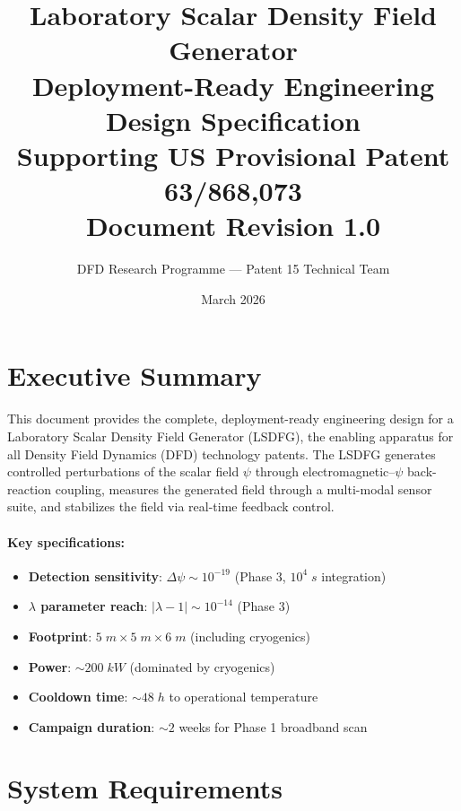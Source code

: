 \documentclass[11pt,a4paper]{article}
\title{\textbf{Laboratory Scalar Density Field Generator}\\[6pt]
\large Deployment-Ready Engineering Design Specification\\[6pt]
\normalsize Supporting US Provisional Patent 63/868,073\\
Document Revision 1.0}
\author{DFD Research Programme --- Patent 15 Technical Team}
\date{March 2026}
\begin{document}
\maketitle
\tableofcontents
\newpage

\section{Executive Summary}

This document provides the complete, deployment-ready engineering
design for a Laboratory Scalar Density Field Generator (LSDFG),
the enabling apparatus for all Density Field Dynamics (DFD)
technology patents.  The LSDFG generates controlled perturbations
of the scalar field $\psi$ through electromagnetic--$\psi$
back-reaction coupling, measures the generated field through a
multi-modal sensor suite, and stabilizes the field via real-time
feedback control.

\paragraph{Key specifications:}
\begin{itemize}[nosep]
\item \textbf{Detection sensitivity}: $\Delta\psi \sim 10^{-19}$
(Phase 3, $10^4\;\si{s}$ integration)
\item \textbf{$\lambda$ parameter reach}:
$|\lambda - 1| \sim 10^{-14}$ (Phase 3)
\item \textbf{Footprint}: $5\;\si{m} \times 5\;\si{m} \times 6\;\si{m}$
(including cryogenics)
\item \textbf{Power}: $\sim 200\;\si{kW}$ (dominated by cryogenics)
\item \textbf{Cooldown time}: $\sim 48\;\si{h}$ to operational
temperature
\item \textbf{Campaign duration}: $\sim 2$ weeks for Phase 1
broadband scan
\end{itemize}

\section{System Requirements}
\end{document}
